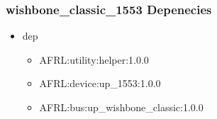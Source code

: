 \subsubsection{wishbone\_classic\_1553 Depenecies}
\begin{itemize}
\item dep
	\begin{itemize}
	\item AFRL:utility:helper:1.0.0
	\item AFRL:device:up\_1553:1.0.0
	\item AFRL:bus:up\_wishbone\_classic:1.0.0
	\end{itemize}
\end{itemize}

